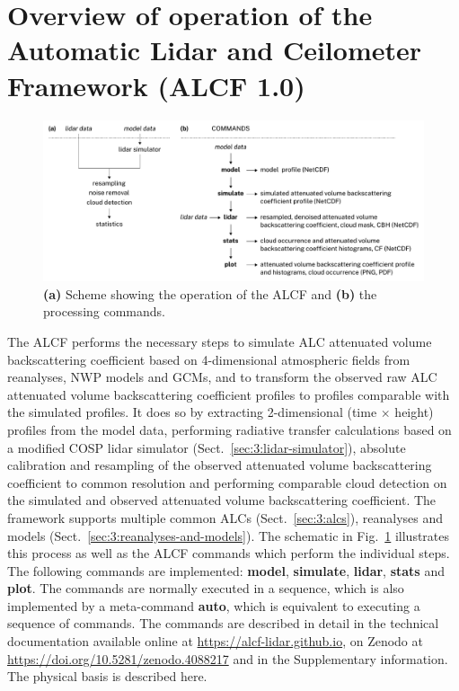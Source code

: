 \section{Overview of operation of the Automatic Lidar and Ceilometer Framework (ALCF 1.0)}
\label{sec:3:alcf}

\begin{figure}[t]
\includegraphics[width=\textwidth]{chapter3/fig/scheme_rev2.pdf}
\caption[Scheme showing the operation of the ALCF and the processing commands]{\textbf{(a)} Scheme showing the operation of the ALCF and \textbf{(b)} the processing commands.}
\label{fig:3:scheme}
\end{figure}

The ALCF performs the necessary
steps to simulate ALC attenuated volume backscattering coefficient based on 4-dimensional atmospheric fields
from reanalyses, NWP models and GCMs, and to transform the observed raw ALC
attenuated volume backscattering coefficient profiles to profiles comparable with the simulated profiles.
It does so by extracting 2-dimensional (time $\times$ height) profiles from the
model data, performing radiative transfer calculations based on a modified COSP
lidar simulator (Sect.~\ref{sec:3:lidar-simulator}),
absolute calibration and resampling of the observed attenuated volume backscattering coefficient
to common resolution and performing comparable cloud detection on the simulated
and observed attenuated volume backscattering coefficient.
The framework
supports multiple common ALCs (Sect.~\ref{sec:3:alcs}), reanalyses and models
(Sect.~\ref{sec:3:reanalyses-and-models}).
The schematic in Fig.~\ref{fig:3:scheme} illustrates this process
as well as the ALCF commands which perform the individual steps.
The following commands are implemented: \textbf{model}, \textbf{simulate},
\textbf{lidar}, \textbf{stats} and \textbf{plot}. The commands are normally
executed in a sequence, which is also implemented by a meta-command \textbf{auto},
which is equivalent to executing a sequence of commands. The commands are
described in detail in the technical documentation available online at
\url{https://alcf-lidar.github.io}, on Zenodo at \url{https://doi.org/10.5281/zenodo.4088217}
and in the Supplementary information. The physical basis is described here.

